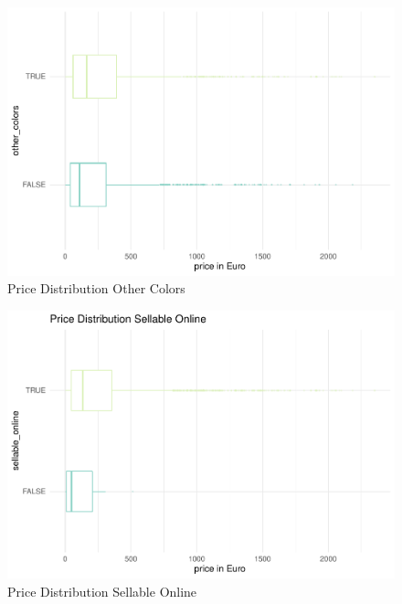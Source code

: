 \documentclass[a4paper, nobind]{templates/ociamthesis}
\begin{document}
\begin{figure}
\includegraphics[width=1\linewidth]{_main_files/figure-latex/price-dist-other-colors-1} \caption{Price Distribution Other Colors}\label{fig:price-dist-other-colors}
\end{figure}

\begin{figure}[!h]
\includegraphics[width=1\linewidth]{_main_files/figure-latex/price-dist-sellable-online-1} \caption{Price Distribution Sellable Online}\label{fig:price-dist-sellable-online}
\end{figure}
\end{document}
